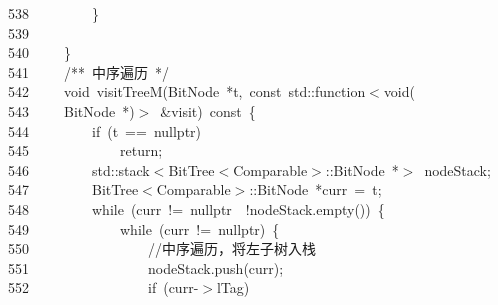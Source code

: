 \documentclass[11pt,a4paper]{ctexart}
\newcommand{\hlstd}[1]{\textcolor[rgb]{0.2,0.2,0.2}{#1}}
\newcommand{\hlslc}[1]{\textcolor[rgb]{0.59,0.59,0.59}{#1}}
\newcommand{\hlcom}[1]{\textcolor[rgb]{0.59,0.59,0.59}{#1}}
\newcommand{\hlopt}[1]{\textcolor[rgb]{0.2,0.2,0.2}{#1}}
\newcommand{\hllin}[1]{\textcolor[rgb]{0.59,0.59,0.59}{#1}}
\newcommand{\hlkwa}[1]{\textcolor[rgb]{0.23,0.42,0.78}{#1}}
\newcommand{\hlkwb}[1]{\textcolor[rgb]{0.63,0,0.31}{#1}}
\newcommand{\hlkwc}[1]{\textcolor[rgb]{0,0.63,0.31}{#1}}
\newcommand{\hlkwd}[1]{\textcolor[rgb]{0.78,0.23,0.41}{#1}}
\begin{document}
\hllin{538\ }\hlstd{}\hlstd{\ \ \ \ \ \ \ \ }\hlstd{}\hlopt{\}}\\
\hllin{539\ }\hlstd{}\\
\hllin{540\ }\hlstd{}\hlstd{\ \ \ \ }\hlstd{}\hlopt{\}}\\
\hllin{541\ }\hlstd{}\hlstd{\ \ \ \ }\hlstd{}\hlcom{/{*}{*}\ 中序遍历\ {*}/}\hlstd{}\\
\hllin{542\ }\hlstd{}\hlstd{\ \ \ \ }\hlstd{}\hlkwb{void\ }\hlstd{}\hlkwd{visitTreeM}\hlstd{}\hlopt{(}\hlstd{BitNode\ }\hlopt{{*}}\hlstd{t}\hlopt{,\ }\hlstd{}\hlkwb{const\ }\hlstd{}\hlkwc{std}\hlstd{}\hlopt{::}\hlstd{function}\hlopt{$<$}\hlstd{}\hlkwb{void}\hlstd{}\hlopt{(}\Righttorque\\
\hllin{543\ }\hlstd{}\hlstd{\ \ \ \ }\hlstd{BitNode\ }\hlopt{{*})$>$\ \&}\hlstd{visit}\hlopt{)\ }\hlstd{}\hlkwb{const\ }\hlstd{}\hlopt{\{}\\
\hllin{544\ }\hlstd{}\hlstd{\ \ \ \ \ \ \ \ }\hlstd{}\hlkwa{if\ }\hlstd{}\hlopt{(}\hlstd{t\ }\hlopt{==\ }\hlstd{}\hlkwc{nullptr}\hlstd{}\hlopt{)}\\
\hllin{545\ }\hlstd{}\hlstd{\ \ \ \ \ \ \ \ \ \ \ \ }\hlstd{}\hlkwa{return}\hlstd{}\hlopt{;}\\
\hllin{546\ }\hlstd{}\hlstd{\ \ \ \ \ \ \ \ }\hlstd{}\hlkwc{std}\hlstd{}\hlopt{::}\hlstd{stack}\hlopt{$<$}\hlstd{BitTree}\hlopt{$<$}\hlstd{Comparable}\hlopt{$>$::}\hlstd{BitNode\ }\hlopt{{*}$>$\ }\hlstd{nodeStack}\hlopt{;}\\
\hllin{547\ }\hlstd{}\hlstd{\ \ \ \ \ \ \ \ }\hlstd{BitTree}\hlopt{$<$}\hlstd{Comparable}\hlopt{$>$::}\hlstd{BitNode\ }\hlopt{{*}}\hlstd{curr\ }\hlopt{=\ }\hlstd{t}\hlopt{;}\\
\hllin{548\ }\hlstd{}\hlstd{\ \ \ \ \ \ \ \ }\hlstd{}\hlkwa{while\ }\hlstd{}\hlopt{(}\hlstd{curr\ }\hlopt{!=\ }\hlstd{}\hlkwc{nullptr\ }\hlstd{}\hlopt{\textbar \textbar \ !}\hlstd{nodeStack}\hlopt{.}\hlstd{}\hlkwd{empty}\hlstd{}\hlopt{())\ \{}\\
\hllin{549\ }\hlstd{}\hlstd{\ \ \ \ \ \ \ \ \ \ \ \ }\hlstd{}\hlkwa{while\ }\hlstd{}\hlopt{(}\hlstd{curr\ }\hlopt{!=\ }\hlstd{}\hlkwc{nullptr}\hlstd{}\hlopt{)\ \{}\\
\hllin{550\ }\hlstd{}\hlstd{\ \ \ \ \ \ \ \ \ \ \ \ \ \ \ \ }\hlstd{}\hlslc{//中序遍历，将左子树入栈}\\
\hllin{551\ }\hlstd{}\hlstd{\ \ \ \ \ \ \ \ \ \ \ \ \ \ \ \ }\hlstd{nodeStack}\hlopt{.}\hlstd{}\hlkwd{push}\hlstd{}\hlopt{(}\hlstd{curr}\hlopt{);}\\
\hllin{552\ }\hlstd{}\hlstd{\ \ \ \ \ \ \ \ \ \ \ \ \ \ \ \ }\hlstd{}\hlkwa{if\ }\hlstd{}\hlopt{(}\hlstd{curr}\hlopt{{-}$>$}\hlstd{lTag}\hlopt{)}\\
\end{document}
